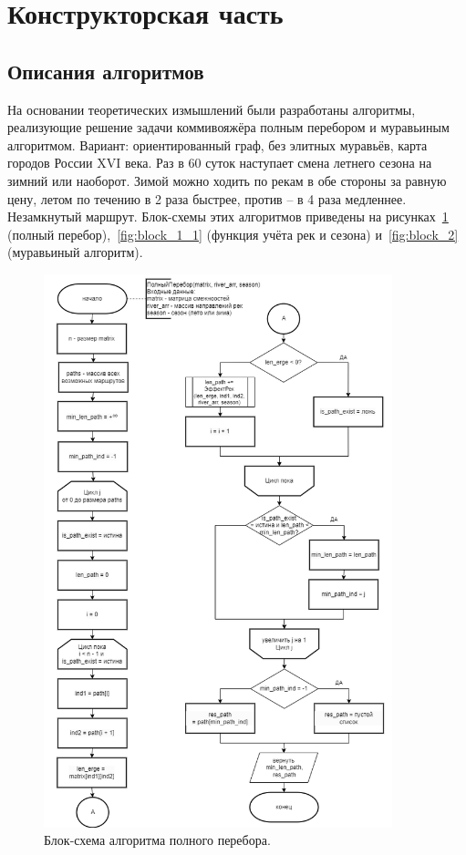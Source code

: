 \section{Конструкторская часть}
\subsection{Описания алгоритмов}

\hspace{1.25cm}
На основании теоретических измышлений были разработаны алгоритмы, реализующие решение задачи коммивояжёра полным перебором и муравьиным алгоритмом. Вариант: ориентированный граф, без элитных муравьёв, карта городов России XVI века. Раз в 60 суток наступает смена летнего сезона на зимний или наоборот. Зимой можно ходить по рекам в обе стороны за равную цену, летом по течению в 2 раза быстрее, против -- в 4 раза медленнее. Незамкнутый маршрут. Блок-схемы этих алгоритмов приведены на рисунках~\ref{fig:block_1} (полный перебор),~\ref{fig:block_1_1} (функция учёта рек и сезона) и~\ref{fig:block_2} (муравьиный алгоритм).

\begin{figure}[H]
    \centering
    \includegraphics[width=0.9\textwidth]{img/block_full_search.png}
    \caption{Блок-схема алгоритма полного перебора.}
    \label{fig:block_1}
\end{figure}

